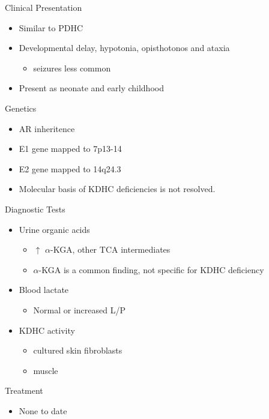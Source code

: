\documentclass[presentation, smaller]{beamer}
\begin{document}
\begin{frame}[label={sec:org4ef3fd4}]{Clinical Presentation}
\begin{itemize}
\item Similar to PDHC
\item Developmental delay, hypotonia, opisthotonos and ataxia
\begin{itemize}
\item seizures less common
\end{itemize}
\item Present as neonate and early childhood
\end{itemize}
\end{frame}

\begin{frame}[label={sec:org991b5ae}]{Genetics}
\begin{itemize}
\item AR inheritence
\item E1 gene mapped to 7p13-14
\item E2 gene mapped to 14q24.3
\item Molecular basis of KDHC deficiencies is not resolved.
\end{itemize}
\end{frame}

\begin{frame}[label={sec:orga5cfb8e}]{Diagnostic Tests}
\begin{itemize}
\item Urine organic acids
\begin{itemize}
\item \(\uparrow\) \(\alpha\)-KGA, \textpm{} other TCA intermediates
\item \(\alpha\)-KGA is a common finding, not specific for KDHC deficiency
\end{itemize}
\item Blood lactate
\begin{itemize}
\item Normal or increased L/P
\end{itemize}
\item KDHC activity
\begin{itemize}
\item cultured skin fibroblasts
\item muscle
\end{itemize}
\end{itemize}
\end{frame}

\begin{frame}[label={sec:org2178d84}]{Treatment}
\begin{itemize}
\item None to date
\end{itemize}
\end{frame}
\end{document}
